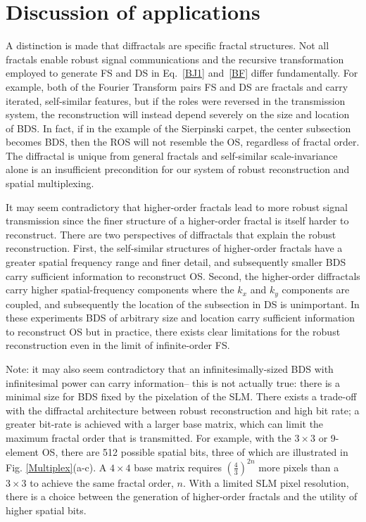 \section{Discussion of applications}\label{disc}
A distinction is made that diffractals are specific fractal structures. Not all fractals enable robust signal communications and the recursive transformation employed to generate FS and DS in Eq.~\ref{BJ1} and~\ref{BF} differ fundamentally. For example, both of the Fourier Transform pairs FS and DS are fractals and carry iterated, self-similar features, but if the roles were reversed in the transmission system, the reconstruction will instead depend severely on the size and location of BDS. In fact, if in the example of the Sierpinski carpet, the center subsection becomes BDS, then the ROS will not resemble the OS, regardless of fractal order.  The diffractal is unique from general fractals and self-similar scale-invariance alone is an insufficient precondition for our system of robust reconstruction and spatial multiplexing. 

It may seem contradictory that higher-order fractals lead to more robust signal transmission since the finer structure of a higher-order fractal is itself harder to reconstruct. There are two perspectives of diffractals that explain the robust reconstruction. First, the self-similar structures of higher-order fractals have a greater spatial frequency range and finer detail, and subsequently smaller BDS carry sufficient information to reconstruct OS. Second, the higher-order diffractals carry higher spatial-frequency components where the $k_x$ and $k_y$ components are coupled, and subsequently the location of the subsection in DS is unimportant. In these experiments BDS of arbitrary size and location carry sufficient information to reconstruct OS but in practice, there exists clear limitations for the robust reconstruction even in the limit of infinite-order FS.  

Note: it may also seem contradictory that an infinitesimally-sized BDS with infinitesimal power can carry information-- this is not actually true: there is a minimal size for BDS fixed by the pixelation of the SLM.
There exists a trade-off with the diffractal architecture between robust reconstruction and high bit rate; a greater bit-rate is achieved with a larger base matrix, which can limit the maximum fractal order that is transmitted.  For example, with the $3\times 3$ or 9-element OS, there are 512 possible spatial bits, three of which are illustrated in Fig. \ref{Multiplex}(a-c).  A $4\times 4$ base matrix requires $(\frac{4}{3})^{2n}$ more pixels than a $3\times 3$ to achieve the same fractal order, $n$. With a limited SLM pixel resolution, there is a choice between the generation of higher-order fractals and the utility of higher spatial bits.   

